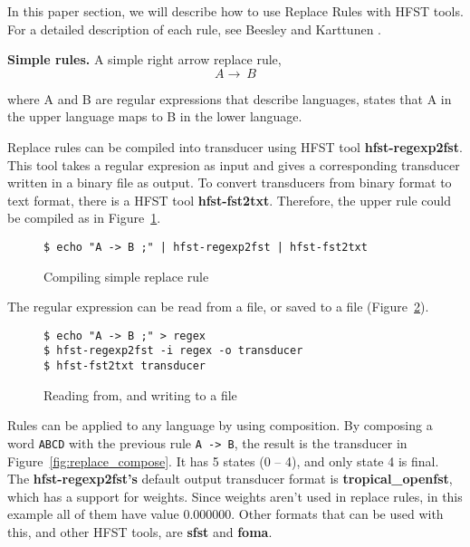 \documentclass{llncs}
\begin{document}
In this paper section, we will describe how to use Replace Rules with HFST tools. For a detailed description of each rule, see Beesley and Karttunen \cite{beesley/2003}.




\textbf{Simple rules.} A simple right arrow replace rule,
\begin{equation}
A \rightarrow\ B
\end{equation}

where A and B are regular expressions that describe languages, states that A in the upper language maps to B in the lower language.

Replace rules can be compiled into transducer using HFST tool \textbf{hfst-regexp\-2fst}.
This tool takes a regular expresion as input and gives a corresponding transducer written in a binary file as output. To convert transducers from binary format to text format, there is a HFST tool \textbf{hfst-fst2txt}. Therefore, the upper rule could be compiled as in Figure~\ref{fig:simple_replace}.

\begin{figure} [h!]
\begin{verbatim}
$ echo "A -> B ;" | hfst-regexp2fst | hfst-fst2txt
\end{verbatim}
\caption{Compiling simple replace rule}
\label{fig:simple_replace}
\end{figure}


The regular expression can be read from a file, or saved to a file (Figure~\ref{fig:read_from_file}). 

\begin{figure} [h!]
\begin{verbatim}
$ echo "A -> B ;" > regex
$ hfst-regexp2fst -i regex -o transducer
$ hfst-fst2txt transducer
\end{verbatim}
\caption{Reading from, and writing to a file}
\label{fig:read_from_file}
\end{figure}


Rules can be applied to any language by using composition. By composing a word \verb!ABCD! with the previous rule \verb!A -> B!, the result is the transducer in Figure~\ref{fig:replace_compose}. It has 5 states (0 -- 4), and only state 4 is final. The \textbf{hfst-regexp2fst's} default output transducer format is \textbf{tropical\_openfst}, which has a support for weights. Since weights aren't used in replace rules, in this example all of them have value 0.000000. Other formats that can be used with this, and other HFST tools, are \textbf{sfst} and \textbf{foma}.
\end{document}
